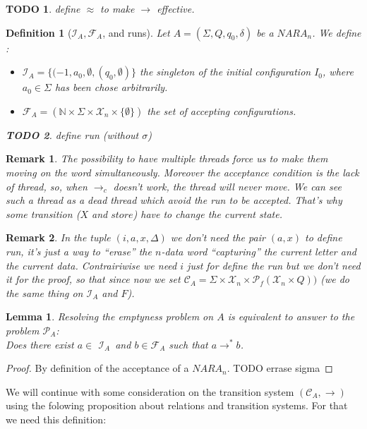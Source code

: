 \documentclass[a4paper,10pt]{report}
\newtheorem{lm}{Lemma}[thr]
\newtheorem{df}{Definition}
\newtheorem{rk}{Remark}
\newtheorem{td}{TODO}
\newcommand{\C}{\mathcal{C}_{A}}
\newcommand{\I}{\mathcal{I}_{A}}
\newcommand{\F}{\mathcal{F}_{A}}
\newcommand{\X}{\mathcal{X}_{n}}
\newcommand{\pb}{$\mathcal{P}_{A}$}
\begin{document}
\begin{td}
 define $\approx$ to make $\rightarrow$ effective.
\end{td}

\begin{df}[$\I,\F$, and runs]
Let $A = (\Sigma ,Q ,q_0, \delta )$ be a $NARA_n$. We define :
\begin{itemize}
 \item $\I = \{(-1,a_0,\emptyset,(q_0,\emptyset)\}$  the singleton of the initial configuration $I_0$, where $a_0 \in \Sigma$ has been chose arbitrarily.
 \item $\F = (\mathbb N \times \Sigma \times \X \times \{\emptyset\})$ the set of accepting configurations.
\end{itemize}


\begin{td}
  define run (without $\sigma$)

\end{td}


\end{df}

\begin{rk}
  The possibility to have multiple threads force us to make them moving on the word simultaneously. 
  Moreover the acceptance condition is the lack of thread, so, when $\rightarrow_c$ doesn't work, the thread will never move. We can see such a thread as a dead thread which avoid the run to be accepted.
  That's why some transition ($X$ and $store$) have to change the current state.
\end{rk}

\begin{rk}
 In the tuple $(i, a,x,\Delta)$ we don't need the pair $(a,x)$ to define run, it's just a way to ``erase'' the $n$-data word ``capturing'' the current letter and the current data.
 Contrairiwise we need $i$ just for define the run but we don't need it for the proof, so that since now we set $ \C = \Sigma \times \X \times \mathcal{P}_f(\X \times Q))$ (we do the same thing on $\I$ and $F$).
\end{rk}


\begin{lm}
  \label{lmtth}
  Resolving the emptyness problem on $A$ is equivalent to answer to the problem \pb: \\
  Does there exist $a \in$ $\I$\ and $b \in\F$ such that $ a \rightarrow^* b $. 
\end{lm}
\begin{proof} 
  By definition of the acceptance of a $NARA_n$. TODO errase sigma
\end{proof}
We will continue with some consideration on the transition system $(\C,\rightarrow)$ using the folowing proposition about relations and transition systems.
For that we need this definition:
\end{document}
